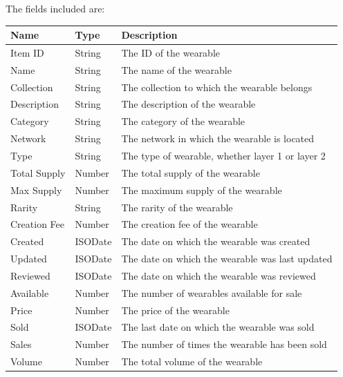 \documentclass[MSE,Master,english]{twbook}%
\begin{document}
The fields included are:
\begin{table}[H]
  \centering
  \begin{tabularx}{\textwidth}{|l|l|X|}
  \hline
  \textbf{Name} & \textbf{Type} & \textbf{Description}                      \\ \hline
  Item ID      & String  & The ID of the wearable                           \\ \hline
  Name         & String  & The name of the wearable                         \\ \hline
  Collection   & String  & The collection to which the wearable belongs     \\ \hline
  Description  & String  & The description of the wearable                  \\ \hline
  Category     & String  & The category of the wearable                     \\ \hline
  Network      & String  & The network in which the wearable is located     \\ \hline
  Type         & String  & The type of wearable, whether layer 1 or layer 2 \\ \hline
  Total Supply & Number  & The total supply of the wearable                 \\ \hline
  Max Supply   & Number  & The maximum supply of the wearable               \\ \hline
  Rarity       & String  & The rarity of the wearable                       \\ \hline
  Creation Fee & Number  & The creation fee of the wearable                 \\ \hline
  Created      & ISODate & The date on which the wearable was created       \\ \hline
  Updated      & ISODate & The date on which the wearable was last updated  \\ \hline
  Reviewed     & ISODate & The date on which the wearable was reviewed      \\ \hline
  Available    & Number  & The number of wearables available for sale       \\ \hline
  Price        & Number  & The price of the wearable                        \\ \hline
  Sold         & ISODate & The last date on which the wearable was sold     \\ \hline
  Sales        & Number  & The number of times the wearable has been sold   \\ \hline
  Volume       & Number  & The total volume of the wearable                 \\ \hline

\end{tabularx}
\end{table}
\end{document}
